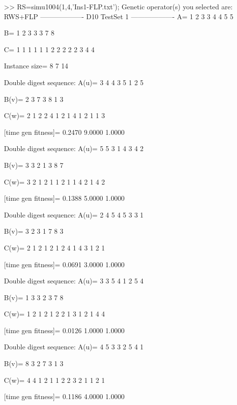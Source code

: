 >> RS=simu1004(1,4,'Ins1-FLP.txt');
Genetic operator(s) you selected are:
RWS+FLP
------------------- D10 TestSet 1 -------------------
A=
     1     2     3     3     4     4     5     5

B=
     1     2     3     3     3     7     8

C=
     1     1     1     1     1     1     2     2     2     2     2     3     4     4

Instance size=
     8     7    14

Double digest sequence:
A(u)=
     3     4     4     3     5     1     2     5

B(v)=
     2     3     7     3     8     1     3

C(w)=
     2     1     2     2     4     1     2     1     4     1     2     1     1     3

[time gen fitness]=
    0.2470    9.0000    1.0000

Double digest sequence:
A(u)=
     5     5     3     1     4     3     4     2

B(v)=
     3     3     2     1     3     8     7

C(w)=
     3     2     1     2     1     1     2     1     1     4     2     1     4     2

[time gen fitness]=
    0.1388    5.0000    1.0000

Double digest sequence:
A(u)=
     2     4     5     4     5     3     3     1

B(v)=
     3     2     3     1     7     8     3

C(w)=
     2     1     2     1     2     1     2     4     1     4     3     1     2     1

[time gen fitness]=
    0.0691    3.0000    1.0000

Double digest sequence:
A(u)=
     3     3     5     4     1     2     5     4

B(v)=
     1     3     3     2     3     7     8

C(w)=
     1     2     1     2     1     2     2     1     3     1     2     1     4     4

[time gen fitness]=
    0.0126    1.0000    1.0000

Double digest sequence:
A(u)=
     4     5     3     3     2     5     4     1

B(v)=
     8     3     2     7     3     1     3

C(w)=
     4     4     1     2     1     1     2     2     3     2     1     1     2     1

[time gen fitness]=
    0.1186    4.0000    1.0000

